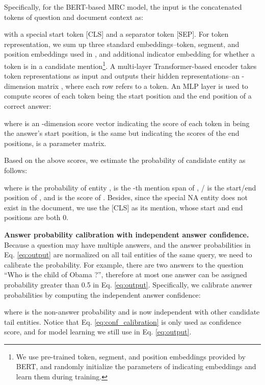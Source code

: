 \documentclass[11pt,a4paper]{article}
\begin{document}
  Specifically,  for the BERT-based MRC model, the input  is the concatenated tokens of question  and document context  as:
  
  \noindent 
  
  \noindent with a special start token [CLS] and a separator token [SEP].
  For token representation, we sum up three standard embeddings--token, segment, and position embeddings used in \citet{devlin_bert_2019}, and additional indicator embedding for whether a token is in a candidate mention\footnote{We use pre-trained token, segment, and position embeddings provided by BERT, and randomly initialize the parameters of indicating embeddings and learn them during training.}.
  A multi-layer Transformer-based \cite{vaswani_attention_2017} encoder takes token representations as input and outputs their hidden representations--an -dimension matrix , where each row refers to a token.
  An MLP layer is used to compute scores of each token being the start position and the end position of a correct answer:
  
  \noindent where  is an -dimension score vector indicating the score of each token in  being the answer's start position, 
   is the same but indicating the scores of the end positions,  is a  parameter matrix.
  
  Based on the above scores, we estimate the probability of candidate entity  as follows:
  
  \noindent where  is the probability of entity ,  is the -th mention span of , / is the start/end position of , and  is the score of .
  Besides, since the special NA entity does not exist in the document, we use the [CLS] as its mention, whose start and end positions are both 0.
  
  \textbf{Answer probability calibration with independent answer confidence.}
  Because a question may have multiple answers, and the answer probabilities in Eq. \ref{eq:output} are normalized on all tail entities of the same  query, we need to calibrate the probability.
  For example, there are two answers to the question ``Who is the child of Obama ?'', therefore at most one answer can be assigned probability greater than 0.5 in Eq. \ref{eq:output}.
  Specifically, we calibrate answer probabilities by computing the independent answer confidence:
  
  \noindent where  is the non-answer probability and  is now independent with other candidate tail entities.
  Notice that Eq. \ref{eq:conf_calibration} is only used as confidence score, and for model learning we still use  in Eq. \ref{eq:output}.
  
\end{document}
